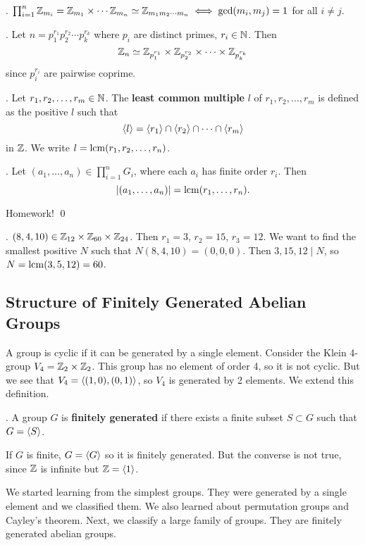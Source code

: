 \cor. \(\prod_{i=1}^n \mathbb{Z}_{m_i} = \mathbb{Z}_{m_1} \times \cdots \mathbb{Z}_{m_n} \simeq \mathbb{Z}_{m_1 m_2 \cdots m_n} \iff \gcd(m_i, m_j) = 1\) for all \(i \neq j\).

\ex. Let \(n = p_1^{r_1}p_2^{r_2} \cdots p_k^{r_k}\) where \(p_i\) are distinct primes, \(r_i \in \mathbb{N}\). Then
\[
    \mathbb{Z}_n \simeq \mathbb{Z}_{p_1^{r_1}} \times \mathbb{Z}_{p_2^{r_2}} \times \cdots \times \mathbb{Z}_{p_k^{r_k}}
\]
since \(p_i^{r_i}\) are pairwise coprime.

.  Let \(r_1, r_2, \dots, r_m \in \mathbb{N}\). The \textbf{least common multiple} \(l\) of \(r_1, r_2, \dots, r_m\) is defined as the positive \(l\) such that
\[
    \left\langle l \right\rangle = \left\langle r_1 \right\rangle \cap \left\langle r_2 \right\rangle \cap \cdots \cap \left\langle r_m \right\rangle
\]
in \(\mathbb{Z}\). We write \(l = {\rm lcm}(r_1, r_2, \dots, r_n)\).

\thm. Let \((a_1, \dots, a_n) \in \prod_{i=1}^n G_i\), where each \(a_i\) has finite order \(r_i\). Then
\[
    \left| (a_1, \dots, a_n) \right| = {\rm lcm}(r_1, \dots, r_n).
\]

\pf Homework! \qed

\ex. \((8, 4, 10) \in \mathbb{Z}_{12} \times \mathbb{Z}_{60} \times \mathbb{Z}_{24}\). Then \(r_1 = 3\), \(r_2 = 15\), \(r_3 = 12\). We want to find the smallest positive \(N\) such that \(N (8, 4, 10) = (0, 0, 0)\). Then \(3, 15, 12 \mid N\), so \(N = {\rm lcm}(3, 5, 12) = 60\).

\subsection*{Structure of Finitely Generated Abelian Groups}

A group is cyclic if it can be generated by a single element. Consider the Klein 4-group \(V_4 = \mathbb{Z}_2 \times \mathbb{Z}_2\). This group has no element of order 4, so it is not cyclic. But we see that \(V_4 = \left\langle (1, 0), (0, 1) \right\rangle\), so \(V_4\) is generated by 2 elements. We extend this definition.

.  A group \(G\) is \textbf{finitely generated} if there exists a finite subset \(S \subset G\) such that \(G = \left\langle S \right\rangle\).

\rmk If \(G\) is finite, \(G = \left\langle G \right\rangle\) so it is finitely generated. But the converse is not true, since \(\mathbb{Z}\) is infinite but \(\mathbb{Z} = \left\langle 1 \right\rangle\).

We started learning from the simplest groups. They were generated by a single element and we classified them. We also learned about permutation groups and Cayley's theorem. Next, we classify a large family of groups. They are finitely generated abelian groups.

